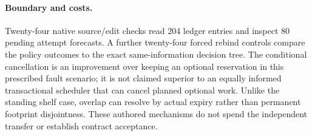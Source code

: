 \documentclass[11pt]{article}
\begin{document}
\paragraph{Boundary and costs.}
Twenty-four native source/edit checks read 204 ledger entries
and inspect 80 pending attempt forecasts. A further twenty-four
forced rebind controls compare the policy outcomes to the exact
same-information decision tree. The conditional cancellation is
an improvement over keeping an optional reservation in this
prescribed fault scenario; it is not claimed superior to an
equally informed transactional scheduler that can cancel planned
optional work. Unlike the standing shelf case, overlap can
resolve by actual expiry rather than permanent footprint
disjointness. These authored mechanisms do not spend the
independent transfer or establish contract acceptance.
\end{document}
